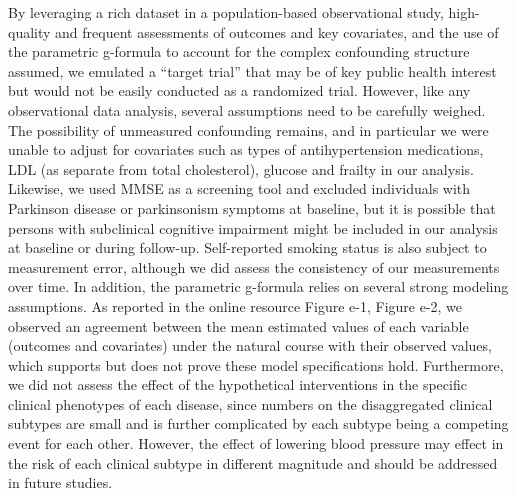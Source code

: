 \documentclass[
]{book}
\begin{document}
By leveraging a rich dataset in a population-based observational study, high-quality and frequent assessments of outcomes and key covariates, and the use of the parametric g-formula to account for the complex confounding structure assumed, we emulated a ``target trial'' that may be of key public health interest but would not be easily conducted as a randomized trial. However, like any observational data analysis, several assumptions need to be carefully weighed. The possibility of unmeasured confounding remains, and in particular we were unable to adjust for covariates such as types of antihypertension medications, LDL (as separate from total cholesterol), glucose and frailty in our analysis. Likewise, we used MMSE as a screening tool and excluded individuals with Parkinson disease or parkinsonism symptoms at baseline, but it is possible that persons with subclinical cognitive impairment might be included in our analysis at baseline or during follow-up\autocite{joe2019}. Self-reported smoking status is also subject to measurement error, although we did assess the consistency of our measurements over time. In addition, the parametric g-formula relies on several strong modeling assumptions. As reported in the online resource Figure e-1, Figure e-2, we observed an agreement between the mean estimated values of each variable (outcomes and covariates) under the natural course with their observed values, which supports but does not prove these model specifications hold\autocite{taubman2009}. Furthermore, we did not assess the effect of the hypothetical interventions in the specific clinical phenotypes of each disease, since numbers on the disaggregated clinical subtypes are small and is further complicated by each subtype being a competing event for each other. However, the effect of lowering blood pressure may effect in the risk of each clinical subtype in different magnitude and should be addressed in future studies.
\end{document}
